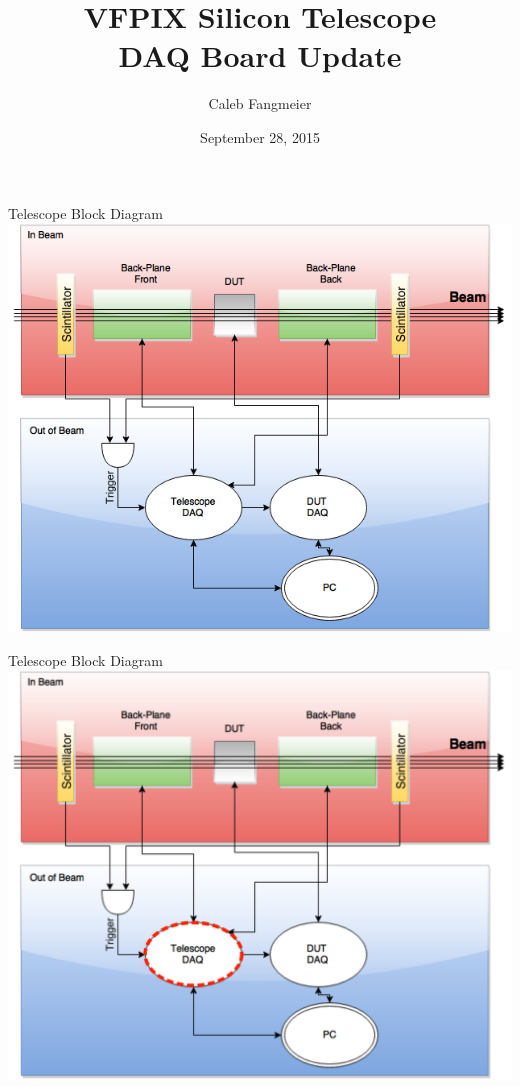 \documentclass{beamer}
\title[DAQ Update]{VFPIX Silicon Telescope \\ DAQ Board Update}
\author[C. Fangmeier]{Caleb Fangmeier}
\institute[UNL]{Univ.\ of Nebraska \-- Lincoln}
\date{September 28, 2015}
\begin{document}
\begin{frame}[plain]
  \titlepage
  \addtocounter{framenumber}{-1}
\end{frame}


\begin{frame}{Telescope Block Diagram}
  \centering
  \includegraphics[height=0.9\textheight]{figures/Telescope_Hierarchy}
\end{frame}

\begin{frame}{Telescope Block Diagram}
  \centering
  \includegraphics[height=0.9\textheight]{figures/Telescope_Hierarchy_Emph}
\end{frame}
\end{document}
